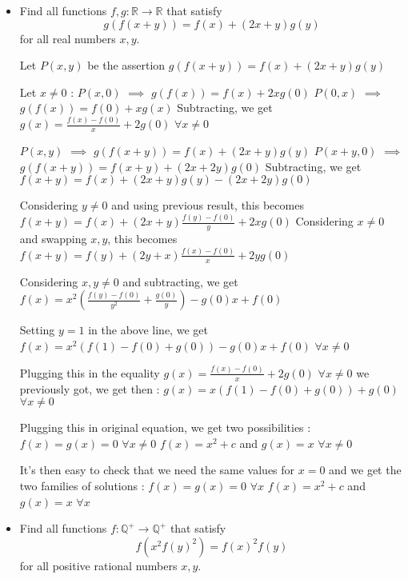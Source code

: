 \documentclass[11pt]{scrartcl}
\begin{document}
\begin{itemize}[label=, leftmargin=0em, itemsep=0.2em]
    \item \begin{bt}
        Find all functions $f,g: \mathbb{R} \to \mathbb{R}$ that satisfy
        \[g(f(x+y)) = f(x) + (2x + y)g(y)\]
        for all real numbers $x,y$.
    \end{bt}
    \begin{sol}
        Let $P(x,y)$ be the assertion $g(f(x+y))=f(x)+(2x+y)g(y)$

        Let $x\ne 0$ :
        $P(x,0)$ $\implies$ $g(f(x))=f(x)+2xg(0)$
        $P(0,x)$ $\implies$ $g(f(x))=f(0)+xg(x)$
        Subtracting, we get $g(x)=\frac{f(x)-f(0)}x+2g(0)$ $\forall x\ne 0$

        $P(x,y)$ $\implies$ $g(f(x+y))=f(x)+(2x+y)g(y)$
        $P(x+y,0)$ $\implies$ $g(f(x+y))=f(x+y)+(2x+2y)g(0)$
        Subtracting, we get $f(x+y)=f(x)+(2x+y)g(y)-(2x+2y)g(0)$

        Considering $y\ne 0$ and using previous result, this becomes $f(x+y)=f(x)+(2x+y)\frac{f(y)-f(0)}y+2xg(0)$
        Considering $x\ne 0$ and swapping $x,y$, this becomes $f(x+y)=f(y)+(2y+x)\frac{f(x)-f(0)}x+2yg(0)$

        Considering $x,y\ne 0$ and subtracting, we get $f(x)=x^2(\frac{f(y)-f(0)}{y^2}+\frac{g(0)}y)-g(0)x+f(0)$

        Setting $y=1$ in the above line, we get $f(x)=x^2(f(1)-f(0)+g(0))-g(0)x+f(0)$ $\forall x\ne 0$

        Plugging this in the equality $g(x)=\frac{f(x)-f(0)}x+2g(0)$ $\forall x\ne 0$ we previously got, we get then :
        $g(x)=x(f(1)-f(0)+g(0))+g(0)$ $\forall x\ne 0$

        Plugging this in original equation, we get two possibilities :
        $f(x)=g(x)=0$ $\forall x\ne 0$
        $f(x)=x^2+c$ and $g(x)=x$ $\forall x\ne 0$

        It's then easy to check that we need the same values for $x=0$ and we get the two families of solutions :
        $f(x)=g(x)=0$ $\forall x$
        $f(x)=x^2+c$ and $g(x)=x$ $\forall x$
    \end{sol}

    \item \begin{bt}
        Find all functions $f: \mathbb{Q}^+ \to \mathbb{Q}^+$ that satisfy
        \[
        f(x^2f(y)^2)=f(x)^2f(y)\tag{1}
        \]
        for all positive rational numbers $x,y$.
    \end{bt}
\begin{sol}


\end{sol}
\end{itemize}
\end{document}

